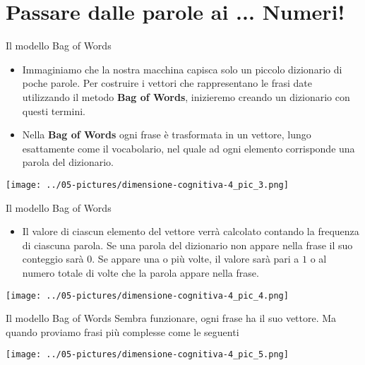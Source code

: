 \documentclass[aspectratio=169]{beamer}
\begin{document}
\section{Passare dalle parole ai ... Numeri!}
%
%
\begin{frame}{Il modello Bag of Words}
\begin{itemize}
\item Immaginiamo che la nostra macchina capisca solo un piccolo dizionario di poche parole. Per costruire i vettori che rappresentano le frasi date utilizzando il metodo \textbf{Bag of Words}, inizieremo creando un dizionario con questi termini. 

\item Nella \textbf{Bag of Words} ogni frase è trasformata in un vettore, lungo esattamente come il vocabolario, nel quale ad ogni elemento corrisponde una parola del dizionario.

\end{itemize}
\begin{center}
\texttt{[image: ../05-pictures/dimensione-cognitiva-4\_pic\_3.png]} 
\end{center}

\end{frame}
%
%
\begin{frame}{Il modello Bag of Words}
\begin{itemize}
\small
\item Il valore di ciascun elemento del vettore verrà calcolato contando la frequenza di ciascuna parola. Se una parola del dizionario non appare nella frase il suo conteggio sarà $0$. Se appare una o più volte, il valore sarà pari a $1$ o al numero totale di volte che la parola appare nella frase.
\end{itemize}
\begin{center}
\texttt{[image: ../05-pictures/dimensione-cognitiva-4\_pic\_4.png]} 
\end{center}
\end{frame}
%
%
\begin{frame}{Il modello Bag of Words}
Sembra funzionare, ogni frase ha il suo vettore. Ma quando proviamo frasi più complesse come le seguenti
\begin{center}
\texttt{[image: ../05-pictures/dimensione-cognitiva-4\_pic\_5.png]} 
\end{center}
\end{frame}
\end{document}
